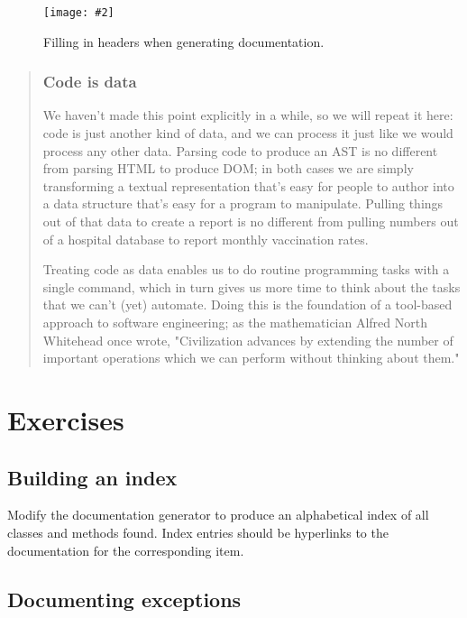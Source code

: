 \documentclass[krantzl]{krantz}
\newcommand{\figpdf}[4]{\begin{figure}%
\centering%
\texttt{[image: \#2]}%
\caption{#3}%
\label{#1}%
\end{figure}}
\newenvironment{callout}{\savenotes\begin{tBox}\begin{quotation}\toggletrue{inbox}\renewcommand{\thempfootnote}{\arabic{footnote}}}{\end{quotation}\vspace{\baselineskip}\end{tBox}\togglefalse{inbox}\spewnotes}
\begin{document}
\figpdf{doc-generator-fill-in-headers}{./doc-generator/fill-in-headers.pdf}{Filling in headers when generating documentation.}{0.6}

\begin{callout}


\subsubsection*{Code is data}


We haven't made this point explicitly in a while,
so we will repeat it here:
code is just another kind of data,
and we can process it just like we would process any other data.
Parsing code to produce an AST is no different from parsing HTML to produce DOM;
in both cases we are simply transforming a textual representation that's easy for people to author
into a data structure that's easy for a program to manipulate.
Pulling things out of that data to create a report
is no different from pulling numbers out of a hospital database to report monthly vaccination rates.


Treating code as data enables us to do routine programming tasks with a single command,
which in turn gives us more time to think about the tasks that we can't (yet) automate.
Doing this is the foundation of a tool-based approach to software engineering;
as the mathematician Alfred North Whitehead once wrote,
"Civilization advances by extending the number of important operations which we can perform without thinking about them."

\end{callout}


\section{Exercises}\label{doc-generator-exercises}

\subsection*{Building an index}


Modify the documentation generator to produce an alphabetical index of all classes and methods found.
Index entries should be hyperlinks to the documentation for the corresponding item.

\subsection*{Documenting exceptions}
\end{document}
